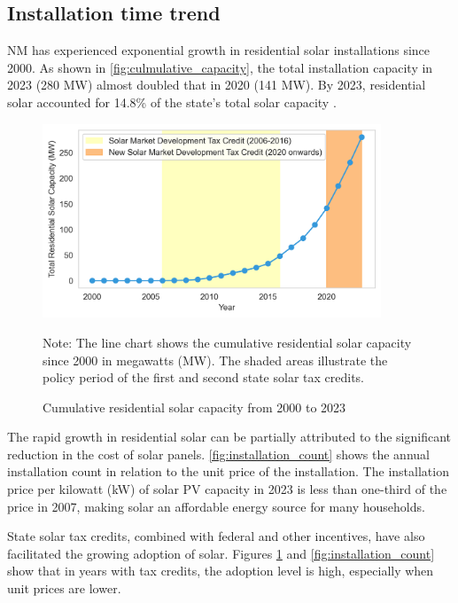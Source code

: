 \documentclass[11pt,twoside,letterpaper]{article}
\begin{document}
\subsection{Installation time trend}
 
NM has experienced exponential growth in residential solar installations since 2000. As shown in \autoref{fig:culmulative_capacity}, the total installation capacity in 2023 (280 MW) almost doubled that in 2020 (141 MW). By 2023, residential solar accounted for 14.8\% of the state’s total solar capacity \parencite{seia2023nm}.

\begin{figure}[!ht]
    \centering
\includegraphics[width=0.9\textwidth]{figures/cumulative_capacity.png}
    \caption{Cumulative residential solar capacity from 2000 to 2023}
    \label{fig:culmulative_capacity}
    \begin{flushleft}
        \footnotesize Note: The line chart shows the cumulative residential solar capacity since 2000 in megawatts (MW). The shaded areas illustrate the policy period of the first and second state solar tax credits.  
    \end{flushleft}
    
\end{figure}


The rapid growth in residential solar can be partially attributed to the significant reduction in the cost of solar panels. \autoref{fig:installation_count} shows the annual installation count in relation to the unit price of the installation. The installation price per kilowatt (kW) of solar PV capacity in 2023 is less than one-third of the price in 2007, making solar an affordable energy source for many households.

State solar tax credits, combined with federal and other incentives, have also facilitated the growing adoption of solar. Figures \ref{fig:culmulative_capacity} and \ref{fig:installation_count} show that in years with tax credits, the adoption level is high, especially when unit prices are lower.
\end{document}
